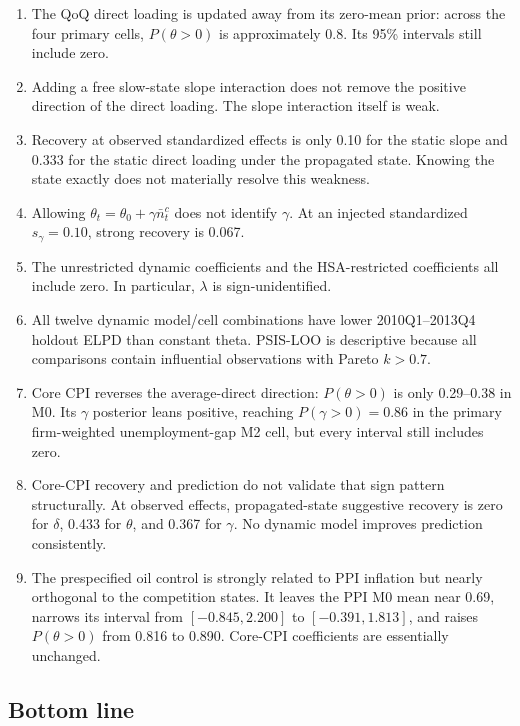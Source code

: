 \documentclass[11pt]{article}
\newcommand{\Nbar}{\bar n}
\begin{document}
\begin{enumerate}
\item The QoQ direct loading is updated away from its zero-mean prior: across the four
primary cells, $P(\theta>0)$ is approximately 0.8. Its 95\% intervals still include zero.
\item Adding a free slow-state slope interaction does not remove the positive direction of
the direct loading. The slope interaction itself is weak.
\item Recovery at observed standardized effects is only 0.10 for the static slope and 0.333
for the static direct loading under the propagated state. Knowing the state exactly does not
materially resolve this weakness.
\item Allowing $\theta_t=\theta_0+\gamma\Nbar_t^c$ does not identify $\gamma$. At an
injected standardized $s_\gamma=0.10$, strong recovery is 0.067.
\item The unrestricted dynamic coefficients and the HSA-restricted coefficients all include
zero. In particular, $\lambda$ is sign-unidentified.
\item All twelve dynamic model/cell combinations have lower 2010Q1--2013Q4 holdout ELPD
than constant theta. PSIS-LOO is descriptive because all comparisons contain influential
observations with Pareto $k>0.7$.
\item Core CPI reverses the average-direct direction: $P(\theta>0)$ is only 0.29--0.38 in
M0. Its $\gamma$ posterior leans positive, reaching $P(\gamma>0)=0.86$ in the primary
firm-weighted unemployment-gap M2 cell, but every interval still includes zero.
\item Core-CPI recovery and prediction do not validate that sign pattern structurally.
At observed effects, propagated-state suggestive recovery is zero for $\delta$, 0.433 for
$\theta$, and 0.367 for $\gamma$. No dynamic model improves prediction consistently.
\item The prespecified oil control is strongly related to PPI inflation but nearly
orthogonal to the competition states. It leaves the PPI M0 mean near 0.69, narrows its
interval from $[-0.845,2.200]$ to $[-0.391,1.813]$, and raises $P(\theta>0)$ from 0.816 to
0.890. Core-CPI coefficients are essentially unchanged.
\end{enumerate}

\subsection{Bottom line}
\end{document}
